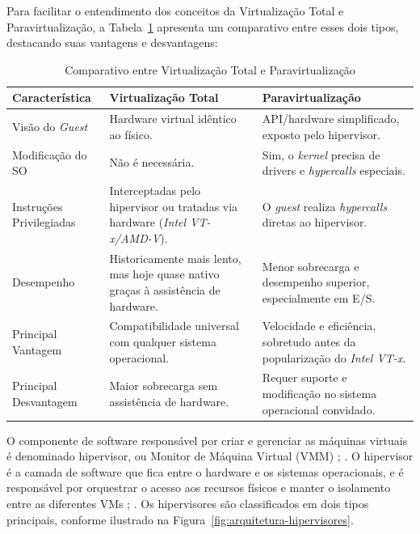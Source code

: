 Para facilitar o entendimento dos conceitos da Virtualização Total e Paravirtualização, a Tabela~\ref{tab:comparativo_virtualizacao} apresenta um comparativo entre esses dois tipos, destacando suas vantagens e desvantagens:
\begin{table}[H]
    \centering
    \caption{Comparativo entre Virtualização Total e Paravirtualização}
    \label{tab:comparativo_virtualizacao}
    \begin{tabular}{|>{\raggedright\arraybackslash}p{}|
                    >{\raggedright\arraybackslash}p{}|
                    >{\raggedright\arraybackslash}p{}|}
        \hline
        \textbf{Característica} & \textbf{Virtualização Total} & \textbf{Paravirtualização} \\ \hline
        Visão do \textit{Guest} & Hardware virtual idêntico ao físico. 
                                & API/hardware simplificado, exposto pelo hipervisor. \\ \hline
        Modificação do SO       & Não é necessária. 
                                & Sim, o \textit{kernel} precisa de drivers e \textit{hypercalls} especiais. \\ \hline
        Instruções Privilegiadas & Interceptadas pelo hipervisor ou tratadas via hardware (\textit{Intel VT-x/AMD-V}). 
                                & O \textit{guest} realiza \textit{hypercalls} diretas ao hipervisor. \\ \hline
        Desempenho              & Historicamente mais lento, mas hoje quase nativo graças à assistência de hardware. 
                                & Menor sobrecarga e desempenho superior, especialmente em E/S. \\ \hline
        Principal Vantagem      & Compatibilidade universal com qualquer sistema operacional. 
                                & Velocidade e eficiência, sobretudo antes da popularização do \textit{Intel VT-x}. \\ \hline
        Principal Desvantagem   & Maior sobrecarga sem assistência de hardware. 
                                & Requer suporte e modificação no sistema operacional convidado. \\ \hline
    \end{tabular}
\end{table}
O componente de software responsável por criar e gerenciar as máquinas virtuais é denominado hipervisor, ou Monitor de Máquina Virtual (VMM) \cite{chawla2025}; \cite{carissimi2008}. O hipervisor é a camada de software que fica entre o hardware e os sistemas operacionais, e é responsável por orquestrar o acesso aos recursos físicos e manter o isolamento entre as diferentes VMs \cite{chawla2025}; \cite{carissimi2008}. Os hipervisores são classificados em dois tipos principais, conforme ilustrado na Figura~\ref{fig:arquitetura-hipervisores}.

